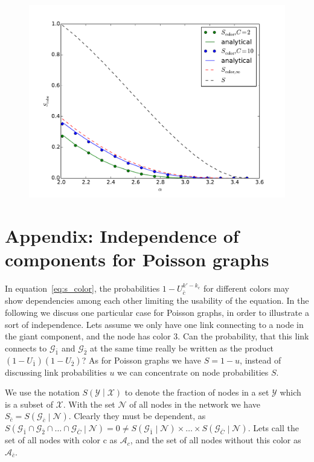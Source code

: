 \documentclass[aps, pre, onecolumn, a4paper, floatfix]{revtex4}
\begin{document}
\begin{figure}[htb]
\begin{center}
	\includegraphics[width=0.6\columnwidth]{S_color_broad.pdf}
	\caption{}
	\label{fig:broad}
\end{center}
\end{figure}





\section*{Appendix: Independence of components for Poisson graphs}

In equation~\ref{eq:s_color}, the probabilities $1-U_{\bar c}^{k'-k_c}$ for 
different colors may show dependencies 
among each other limiting the usability of the equation. In the following we 
discuss one particular case for Poisson graphs, in order to illustrate a sort 
of independence. Lets assume we only have one link connecting to a node in the 
giant component, and the node has color 3. Can the probability, that this link connects 
to ${\mathcal G}_{\bar 1}$ and ${\mathcal G}_{\bar 2}$ at the same time 
really be written as the product $(1-U_{\bar 1})(1-U_{\bar 2})$? 
As for Poisson graphs we 
have $S=1-u$, instead of discussing link probabilities $u$ we can concentrate on 
node probabilities $S$. 

We use the notation $S\left({\mathcal Y}\middle|{\mathcal X}\right)$ to denote 
the fraction of nodes in a set ${\mathcal Y}$ which is a subset of ${\mathcal X}$. With 
the set ${\mathcal N}$ of all nodes in the network we have 
$S_{\bar c}=S\left({\mathcal G}_{\bar c}\middle|{\mathcal N}\right)$. Clearly they must 
be dependent, as 
$S\left({\mathcal G}_{\bar 1}\cap {\mathcal G}_{\bar 2}\cap \dots 
\cap {\mathcal G}_{\bar C}\middle| {\mathcal N}\right)=0\neq 
S\left({\mathcal G}_{\bar 1}\middle| {\mathcal N}\right)\times\dots \times 
S\left({\mathcal G}_{\bar C}\middle| {\mathcal N}\right)$. 
Lets call the set of all nodes with color c as ${\mathcal A}_c$, 
and the set of all nodes without this color as ${\mathcal A}_{\bar c}$. 
\end{document}
